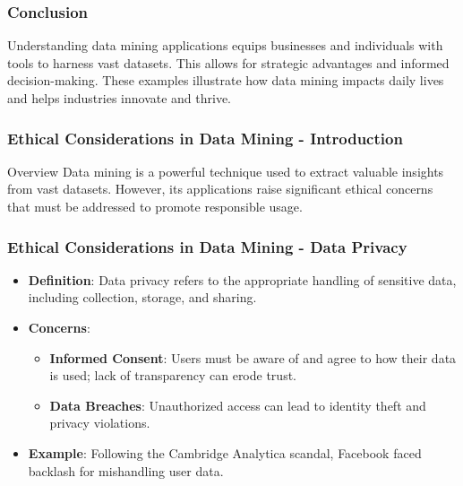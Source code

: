 \documentclass[aspectratio=169]{beamer}
\begin{document}
\begin{frame}[fragile]
    \frametitle{Conclusion}
    Understanding data mining applications equips businesses and individuals with tools to harness vast datasets. This allows for strategic advantages and informed decision-making. These examples illustrate how data mining impacts daily lives and helps industries innovate and thrive.
\end{frame}

\begin{frame}[fragile]
    \frametitle{Ethical Considerations in Data Mining - Introduction}
    \begin{block}{Overview}
        Data mining is a powerful technique used to extract valuable insights from vast datasets. However, its applications raise significant ethical concerns that must be addressed to promote responsible usage.
    \end{block}
\end{frame}

\begin{frame}[fragile]
    \frametitle{Ethical Considerations in Data Mining - Data Privacy}
    \begin{itemize}
        \item \textbf{Definition}: Data privacy refers to the appropriate handling of sensitive data, including collection, storage, and sharing.
        \item \textbf{Concerns}:
            \begin{itemize}
                \item \textbf{Informed Consent}: Users must be aware of and agree to how their data is used; lack of transparency can erode trust.
                \item \textbf{Data Breaches}: Unauthorized access can lead to identity theft and privacy violations.
            \end{itemize}
        \item \textbf{Example}: Following the Cambridge Analytica scandal, Facebook faced backlash for mishandling user data.
    \end{itemize}
\end{frame}
\end{document}
